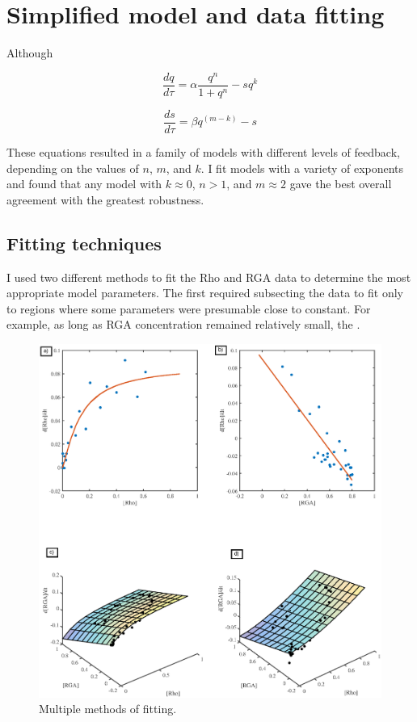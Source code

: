 \section{Simplified model and data fitting}

Although 

\begin{equation}
	\frac{dq}{d\tau} =\alpha \frac{q^n}{1 +q^n} - s q^k
\end{equation}

\begin{equation}
	\frac{ds}{d\tau} = \beta q^{(m-k)} - s
\end{equation}

These equations resulted in a family of models with different levels of feedback, depending on the values of $n$, $m$, and $k$.  I fit models with a variety of exponents and found that any model with $k\approx0$, $n>1$, and $m\approx2$ gave the best overall agreement with the greatest robustness.  

\subsection{Fitting techniques}
I used two different methods to fit the Rho and RGA data to determine the most appropriate model parameters.  The first required subsecting the data to fit only to regions where some parameters were presumable close to constant.  For example, as long as RGA concentration remained relatively small, the .


\begin{figure}[h!]
\centering
\includegraphics[width=\hsize]{pulse/fitting_plot.eps}
\caption{\label{fig:pulse_fit}  Multiple methods of fitting.}
\end{figure}

